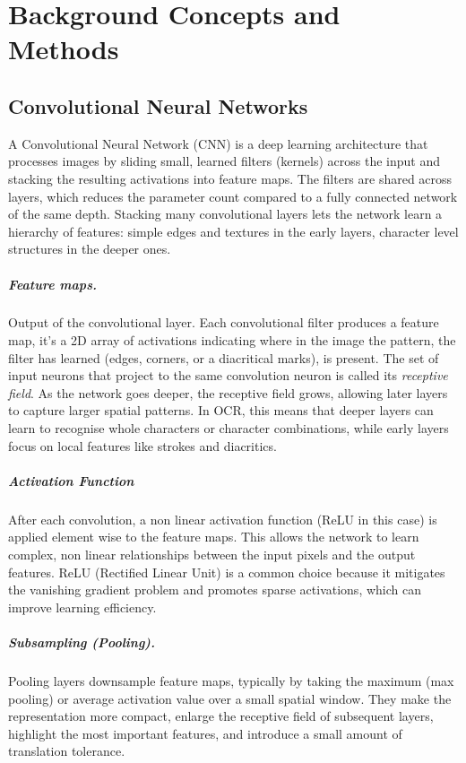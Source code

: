 \chapter{Background Concepts and Methods}
\label{appendix:concepts}

\section{Convolutional Neural Networks}
\label{sec:appendix-cnn}

A Convolutional Neural Network (CNN) is a deep learning architecture that processes images by sliding small, learned filters (kernels) across the input and stacking the resulting activations into feature maps.
The filters are shared across layers, which reduces the parameter count compared to a fully connected network of the same depth.
Stacking many convolutional layers lets the network learn a hierarchy of features: simple edges and textures in the early layers, character level structures in the deeper ones.

\paragraph{Feature maps.} Output of the convolutional layer. Each convolutional filter produces a feature map, it's a 2D array of activations indicating where in the image the pattern, the filter has learned (edges, corners, or a diacritical marks), is present. The set of input neurons that project to the same convolution neuron is called its \textit{receptive field}. As the network goes deeper, the receptive field grows, allowing later layers to capture larger spatial patterns. In OCR, this means that deeper layers can learn to recognise whole characters or character combinations, while early layers focus on local features like strokes and diacritics.

\paragraph{Activation Function}
After each convolution, a non linear activation function (ReLU in this case) is applied element wise to the feature maps. This allows the network to learn complex, non linear relationships between the input pixels and the output features.
ReLU (Rectified Linear Unit) is a common choice because it mitigates the vanishing gradient problem and promotes sparse activations, which can improve learning efficiency.

\paragraph{Subsampling (Pooling).} Pooling layers downsample feature maps, typically by taking the maximum (max pooling) or average activation value over a small spatial window. They make the representation more compact, enlarge the receptive field of subsequent layers, highlight the most important features, and introduce a small amount of translation tolerance.

